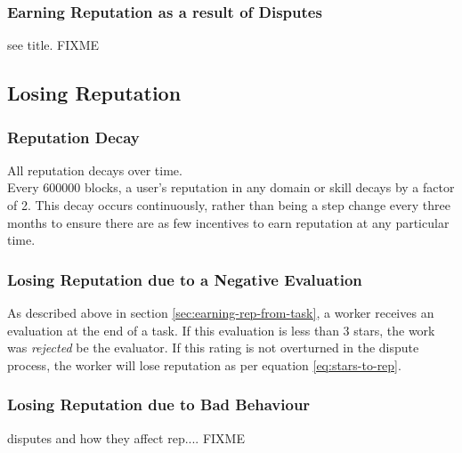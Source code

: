 
\subsubsection{Earning Reputation as a result of Disputes}\label{sec:earning-rep-in-disputes}
see title. FIXME



\subsection{Losing Reputation}\label{sec:losing-rep}

\subsubsection{Reputation Decay}
All reputation decays over time.\\
Every 600000 blocks, a user's reputation in any domain or skill decays by a factor of 2. This decay occurs continuously, rather than being a step change every three months to ensure there are as few incentives to earn reputation at any particular time.

\subsubsection{Losing Reputation due to a Negative Evaluation}
As described above in section \ref{sec:earning-rep-from-task}, a worker receives an evaluation at the end of a task. If this evaluation is less than 3 stars, the work was \emph{rejected} be the evaluator. If this rating is not overturned in the dispute process, the worker will lose reputation as per equation \eqref{eq:stars-to-rep}.


\subsubsection{Losing Reputation due to Bad Behaviour}
disputes and how they affect rep.... FIXME


